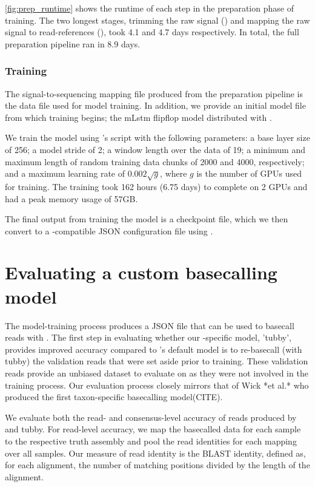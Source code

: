 \autoref{fig:prep_runtime} shows the runtime of each step in the preparation phase of training. The two longest stages, trimming the raw signal () and mapping the raw signal to read-references (), took 4.1 and 4.7 days respectively. In total, the full preparation pipeline ran in 8.9 days. 

\subsubsection{Training}

The signal-to-sequencing mapping file produced from the preparation pipeline is the data file used for model training. In addition, we provide an initial model file from which training begins; the mLstm flipflop model distributed with \taiyaki{}.

We train the model using \taiyaki{}'s  script with the following parameters: a base layer size of 256; a model stride of 2; a window length over the data of 19; a minimum and maximum length of random training data chunks of 2000 and 4000, respectively; and a maximum learning rate of $0.002\sqrt{g}$, where $g$ is the number of GPUs used for training. The training took 162 hours (6.75 days) to complete on 2 GPUs and had a peak memory usage of 57GB. 

The final output from training the model is a checkpoint file, which we then convert to a \guppy{}-compatible JSON configuration file using \taiyaki{}.

\section{Evaluating a custom \ont{} basecalling model}

The model-training process produces a JSON file that can be used to basecall \ont{} reads with \guppy{}. The first step in evaluating whether our \mtb{}-specific model, 'tubby', provides improved accuracy compared to \guppy{}'s default model is to re-basecall (with tubby) the validation reads that were set aside prior to training. These validation reads provide an unbiased dataset to evaluate on as they were not involved in the training process. Our evaluation process closely mirrors that of Wick *et al.* who produced the first taxon-specific \ont{} basecalling model(CITE).  

We evaluate both the read- and consensus-level accuracy of reads produced by \guppy{} and tubby. For read-level accuracy, we map the basecalled data for each sample to the respective truth assembly and pool the read identities for each mapping over all samples. Our measure of read identity is the BLAST identity, defined as, for each alignment, the number of matching positions divided by the length of the alignment.  

